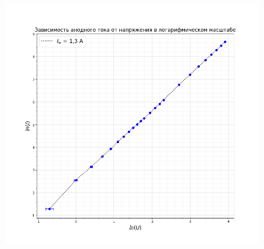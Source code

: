 \documentclass[a4paper,12pt]{article}
\begin{document}
\begin{figure}[H]\label{fig: ln(I)(ln(U)) 1.3}
    \centering
    \includegraphics[width = \textwidth]{ln(I)(ln(U))_13.png}
\end{figure}
\end{document}
